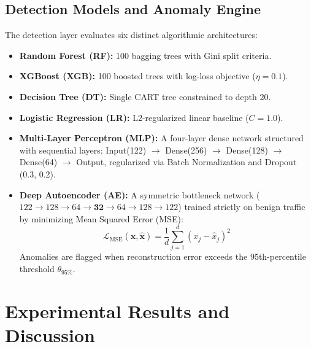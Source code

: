 \documentclass[10pt,twocolumn]{article}
\begin{document}
\subsection{Detection Models and Anomaly Engine}
The detection layer evaluates six distinct algorithmic architectures:
\begin{itemize}
    \item \textbf{Random Forest (RF):} 100 bagging trees with Gini split criteria.
    \item \textbf{XGBoost (XGB):} 100 boosted trees with log-loss objective ($\eta = 0.1$).
    \item \textbf{Decision Tree (DT):} Single CART tree constrained to depth 20.
    \item \textbf{Logistic Regression (LR):} L2-regularized linear baseline ($C=1.0$).
    \item \textbf{Multi-Layer Perceptron (MLP):} A four-layer dense network structured with sequential layers: Input(122) $\rightarrow$ Dense(256) $\rightarrow$ Dense(128) $\rightarrow$ Dense(64) $\rightarrow$ Output, regularized via Batch Normalization and Dropout (0.3, 0.2).
    \item \textbf{Deep Autoencoder (AE):} A symmetric bottleneck network ($122 \rightarrow 128 \rightarrow 64 \rightarrow \mathbf{32} \rightarrow 64 \rightarrow 128 \rightarrow 122$) trained strictly on benign traffic by minimizing Mean Squared Error (MSE):
    \begin{equation}
    \mathcal{L}_{\text{MSE}}(\mathbf{x}, \mathbf{\hat{x}}) = \frac{1}{d} \sum_{j=1}^{d} (x_j - \hat{x}_j)^2
    \end{equation}
    Anomalies are flagged when reconstruction error exceeds the 95th-percentile threshold $\theta_{95\%}$.
\end{itemize}

\section{Experimental Results and Discussion}

\begin{table}[htbp]
\caption{Binary Classification Performance on KDDTest+}
\label{tab:binary_results}
\centering
{}
\end{table}
\end{document}
